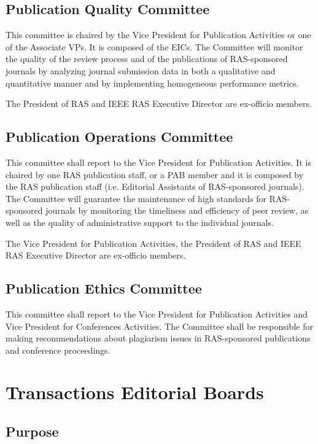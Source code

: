 \documentclass[10pt]{article}
\begin{document}
\subsection{Publication Quality Committee}

This committee is chaired by the Vice President for Publication Activities or one of the Associate VPs. It is composed of the EICs. The Committee will monitor the quality of the review process and of the publications of RAS-sponsored journals by analyzing journal submission data in both a qualitative and quantitative manner and by implementing homogeneous performance metrics.

The President of RAS and IEEE RAS Executive Director are ex-officio members.



\subsection{Publication Operations Committee}

This committee shall report to the Vice President for Publication Activities. It is chaired by one RAS publication staff, or a PAB member and it is composed by the RAS publication staff (i.e. Editorial Assistants of RAS-sponsored journals). The Committee will guarantee the maintenance of high standards for RAS-sponsored journals by monitoring the timeliness and efficiency of peer review, as well as the quality of administrative support to the individual journals.

The Vice President for Publication Activities, the President of RAS and IEEE RAS Executive Director are ex-officio members.


\subsection{Publication Ethics Committee}

This committee shall report to the Vice President for Publication Activities and Vice President for Conferences Activities. The Committee shall be responsible for making recommendations about plagiarism issues in RAS-sponsored publications and conference proceedings.


\section{Transactions Editorial Boards}
\label{TEB}

\subsection{Purpose}
\end{document}
